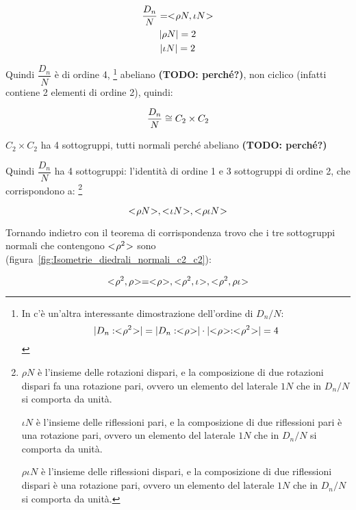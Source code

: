 	\begin{gather}
		\dfrac{D_n}{N} = < \negmedspace \rho N, \iota N \negmedspace > \\
		\lvert \rho N \rvert = 2 \\
		\lvert \iota N \rvert = 2
	\end{gather}

	Quindi $\dfrac{D_n}{N}$ è di ordine 4,
	\footnote{In \cite[p. 48]{garonzi} c'è un'altra interessante dimostrazione dell'ordine di $D_n/N$: \\
	\[\ordine{D_n : \gen{\rho^2}} = \ordine{D_n : \gen{\rho}} \cdot \ordine{\gen{\rho} : \gen{\rho^2}} = 4\]}
	abeliano \textbf{(TODO: perché?)}, non ciclico (infatti contiene 2 elementi di ordine 2), quindi:
	
	\begin{equation}
		\dfrac{D_n}{N} \cong C_2 \times C_2
	\end{equation}
	
	$C_2 \times C_2$ ha 4 sottogruppi, tutti normali perché abeliano \textbf{(TODO: perché?)}
	
	Quindi $\dfrac{D_n}{N}$ ha 4 sottogruppi: l'identità di ordine 1 e 3 sottogruppi di ordine 2, che corrispondono a:
	\footnote{
		$\rho N$ è l'insieme delle rotazioni dispari, e la composizione di due rotazioni dispari fa una rotazione pari, ovvero un elemento del laterale $1 N$ che in $D_n/N$ si comporta da unità. 
		
		$\iota N$ è l'insieme delle riflessioni pari, e la composizione di due riflessioni pari è una rotazione pari, ovvero un elemento del laterale $1 N$ che in $D_n/N$ si comporta da unità. 
		
		$\rho\iota N$ è l'insieme delle riflessioni dispari, e la composizione di due riflessioni dispari è una rotazione pari, ovvero un elemento del laterale $1 N$ che in $D_n/N$ si comporta da unità.
	}
	
	\begin{equation}
		< \negmedspace \rho N \negmedspace >, < \negmedspace \iota N \negmedspace >, < \negmedspace \rho\iota N \negmedspace >
	\end{equation}

	Tornando indietro con il teorema di corrispondenza trovo che i tre sottogruppi normali che contengono $< \negmedspace \rho^2 \negmedspace >$ sono (figura~\ref{fig:Isometrie_diedrali_normali_c2_c2}):
	
	\begin{equation}
		\gen{\rho^2, \rho} = \gen{\rho}, \gen{\rho^2, \iota}, \gen{\rho^2, \rho\iota}
	\end{equation} 
	
